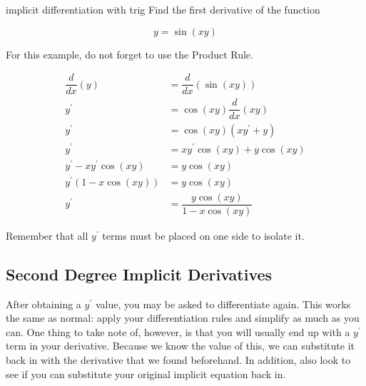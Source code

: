 \begin{example}{implicit differentiation with trig}
    Find the first derivative of the function
    
    \[ y = \sin{\left( x y \right)} \]
    
    For this example, do not forget to use the Product Rule.
    
    \begin{align}
        \dfrac{d}{dx} \left( y \right) &= \dfrac{d}{dx} \left( \sin{\left( x y \right)} \right) \\
        y^\prime &= \cos{\left( xy \right)} \dfrac{d}{dx} \left( xy \right) \\
        y^\prime &= \cos{\left( xy \right)} \left( xy^\prime + y \right) \\
        y^\prime &= x y^\prime \cos{\left( xy \right)} + y \cos{\left( xy \right)} \\
        y^\prime - xy^\prime \cos{\left( xy \right)} &= y \cos{\left( xy \right)} \\
        y^\prime \left( 1 - x\cos{\left( xy \right)} \right) &= y \cos{\left( xy \right)} \\
        y^\prime &= \dfrac{y \cos{\left( xy \right)}}{1 - x \cos{\left( xy \right)}}
    \end{align}
    
    Remember that all \( y^\prime \) terms must be placed on one side to isolate it.
\end{example}

\subsection{Second Degree Implicit Derivatives}

After obtaining a \( y^\prime \) value, you may be asked to differentiate again. This works the same as normal: apply your differentiation rules and simplify as much as you can. One thing to take note of, however, is that you will usually end up with a \( y^\prime \) term in your derivative. Because we know the value of this, we can substitute it back in with the derivative that we found beforehand. In addition, also look to see if you can substitute your original implicit equation back in.

